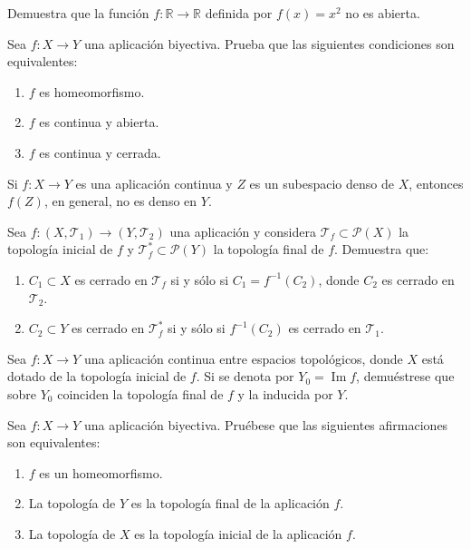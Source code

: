 \begin{ejer}[92]
Demuestra que la función $f \colon \mathbb{R} \to \mathbb{R}$ definida por $f(x) = x^2$ no es abierta.
\end{ejer}

\begin{ejer}[93]
Sea $f \colon X \to Y$ una aplicación biyectiva. Prueba que las siguientes condiciones son equivalentes:
\begin{enumerate}
    \item[a)] $f$ es homeomorfismo.
    \item[b)] $f$ es continua y abierta.
    \item[c)] $f$ es continua y cerrada.
\end{enumerate}
\end{ejer}

\begin{ejer}[94]
Si $f \colon X \to Y$ es una aplicación continua y $Z$ es un subespacio denso de $X$, entonces $f(Z)$, en general, no es denso en $Y$.
\end{ejer}

\begin{ejer}[95]
Sea $f \colon (X, \mathcal{T}_1) \to (Y, \mathcal{T}_2)$ una aplicación y considera $\mathcal{T}_f \subset \mathcal{P}(X)$ la topología inicial de $f$ y $\mathcal{T}_f^* \subset \mathcal{P}(Y)$ la topología final de $f$. Demuestra que:
\begin{enumerate}
    \item[a)] $C_1 \subset X$ es cerrado en $\mathcal{T}_f$ si y sólo si $C_1 = f^{-1}(C_2)$, donde $C_2$ es cerrado en $\mathcal{T}_2$.
    \item[b)] $C_2 \subset Y$ es cerrado en $\mathcal{T}_f^*$ si y sólo si $f^{-1}(C_2)$ es cerrado en $\mathcal{T}_1$.
\end{enumerate}
\end{ejer}

\begin{ejer}[96]
Sea $f \colon X \to Y$ una aplicación continua entre espacios topológicos, donde $X$ está dotado de la topología inicial de $f$. Si se denota por $Y_0 = \operatorname{Im} f$, demuéstrese que sobre $Y_0$ coinciden la topología final de $f$ y la inducida por $Y$.
\end{ejer}

\begin{ejer}[97]
Sea $f \colon X \to Y$ una aplicación biyectiva. Pruébese que las siguientes afirmaciones son equivalentes:
\begin{enumerate}
    \item[a)] $f$ es un homeomorfismo.
    \item[b)] La topología de $Y$ es la topología final de la aplicación $f$.
    \item[c)] La topología de $X$ es la topología inicial de la aplicación $f$.
\end{enumerate}
\end{ejer}

